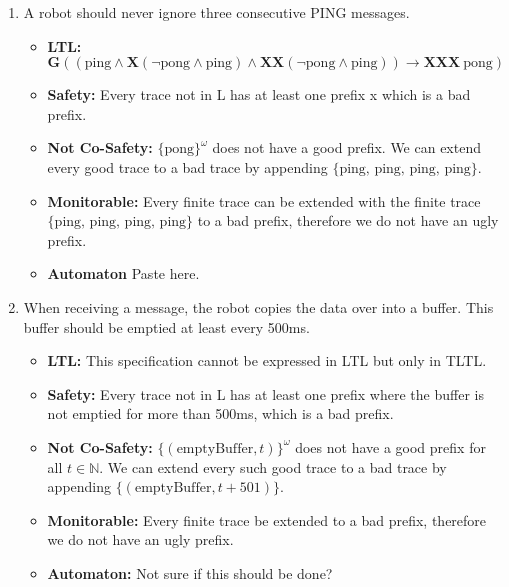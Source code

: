 \documentclass[12pt]{article}
\begin{document}
\begin{enumerate}
\item A robot should never ignore three consecutive PING messages.
	\begin{itemize}
		\item \textbf{LTL:} $\mathbf{G}((\text{ping} \land \mathbf{X}(\neg \text{pong} \land \text{ping}) \land \mathbf{X}\mathbf{X}(\neg \text{pong} \land \text{ping})) \rightarrow \mathbf{X}\mathbf{X}\mathbf{X} \: \text{pong})$
		\item \textbf{Safety:} Every trace not in L has at least one prefix x which is a bad prefix.
		\item \textbf{Not Co-Safety:} $\{ \text{pong}\}^ {\omega}$ does not have a good prefix. We can extend every good trace to a bad trace by appending $\{\text{ping, ping, ping, ping}\}$.
		\item \textbf{Monitorable:} Every finite trace can be extended with the finite trace $\{\text{ping, ping, ping, ping}\}$ to a bad prefix, therefore we do not have an ugly prefix.
		\item \textbf{Automaton} Paste here.
	\end{itemize}		
	
\item When receiving a message, the robot copies the data over into a buffer. This buffer should be emptied at least every 500ms.
	\begin{itemize}
		\item \textbf{LTL:} This specification cannot be expressed in LTL but only in TLTL.
		\item \textbf{Safety:} Every trace not in L has at least one prefix where the buffer is not emptied for more than 500ms, which is a bad prefix.
		\item \textbf{Not Co-Safety:} $\{( \text{emptyBuffer}, t)\}^ {\omega}$ does not have a good prefix for all $t \in \mathbb{N}$. We can extend every such good trace to a bad trace by appending $\{( \text{emptyBuffer}, t + 501)\}$.
		\item \textbf{Monitorable:} Every finite trace be extended to a bad prefix, therefore we do not have an ugly prefix.
		\item \textbf{Automaton:} Not sure if this should be done?
	\end{itemize}				

\end{enumerate}
\end{document}
